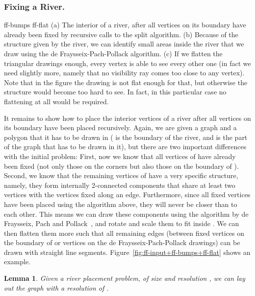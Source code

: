 \documentclass[11pt]{article}
\newtheorem {lemma} {Lemma}
\renewcommand{\subsection}[1]{\subsubsection{#1.}}
\begin{document}
  \subsection {Fixing a River} \label {sec:river}

     {ff-bumps} {ff-flat}
    {(a) The interior of a river, after all vertices on its boundary have already
    been fixed by recursive calls to the split algorithm. (b) Because of
    the structure given by the river, we can identify small areas inside the
    river that we draw using the de Fraysseix-Pach-Pollack algorithm. (c) If we
    flatten the triangular drawings enough, every vertex is able to see every
    other one (in fact we need slightly more, namely that no visibility ray comes
    too close to any vertex). Note that in the figure the drawing is not flat
    enough for that, but otherwise the structure would become too hard to see.
    In fact, in this particular case no flattening at all would be required.}

    It remains to show how to place the interior vertices of a river after all vertices on its boundary have been placed recursively.
    Again, we are given a graph  and a polygon  that it has to be drawn in
    ( is the boundary of the river, and  is the part of the graph
    that has to be drawn in it),
    but there are two important differences with the initial problem:
    First, now we know that all vertices of  have already been fixed
    (not only those on the corners but also those on the boundary of ).
    Second, we know that the remaining vertices of  have a very specific
    structure, namely, they  form internally 2-connected components that
    share at least two vertices with the vertices fixed along an edge.
    Furthermore, since all fixed vertices have been placed using the algorithm
    above, they will never be closer than  to each other.
    This means we can draw these components using the algorithm by de Fraysseix,
    Pach and Pollack~\cite{dpp}, and rotate and scale them to fit inside . We
    can then flatten them more such that all remaining edges (between fixed
    vertices on the boundary of  or vertices on the de Fraysseix-Pach-Pollack
    drawings) can be drawn with straight line segments.
    Figure~\ref {fig:ff-input+ff-bumps+ff-flat} shows an example.




    \begin {lemma} \label {lem:internal}
      Given a river placement problem, of size  and resolution , we can lay
      out the graph with a resolution of .
    \end {lemma}
\end{document}
